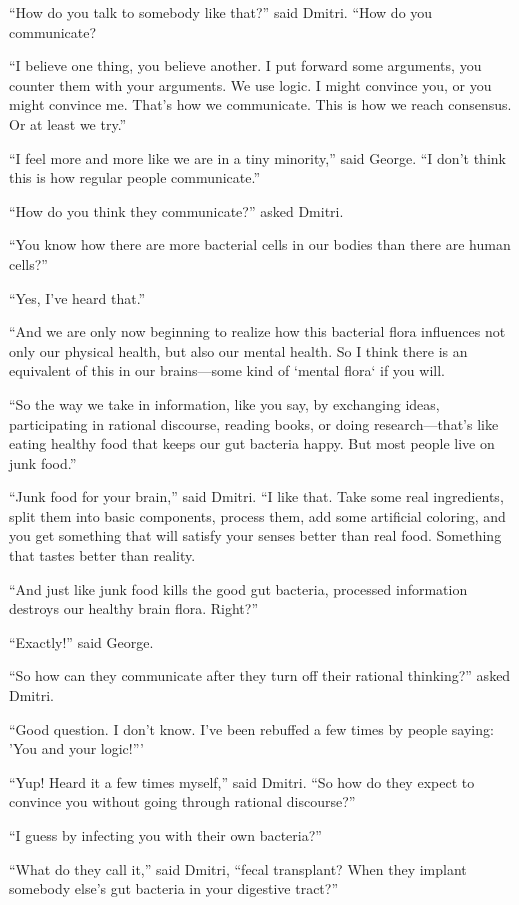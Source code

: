 \documentclass{memoir}
\begin{document}
``How do you talk to somebody like that?'' said Dmitri. ``How do you communicate? 

``I believe one thing, you believe another. I put forward some arguments, you counter them with your arguments. We use logic. I might convince you, or you might convince me. That's how we communicate. This is how we reach consensus. Or at least we try.''

``I feel more and more like we are in a tiny minority,'' said George. ``I don't think this is how regular people communicate.''

``How do you think they communicate?'' asked Dmitri.

``You know how there are more bacterial cells in our bodies than there are human cells?''

``Yes, I've heard that.''

``And we are only now beginning to realize how this bacterial flora influences not only our physical health, but also our mental health. So I think there is an equivalent of this in our brains---some kind of `mental flora` if you will. 

``So the way we take in information, like you say, by exchanging ideas, participating in rational discourse, reading books, or doing research---that's like eating healthy food that keeps our gut bacteria happy. But most people live on junk food.''

``Junk food for your brain,'' said Dmitri. ``I like that. Take some real ingredients, split them into basic components, process them, add some artificial coloring, and you get something that will satisfy your senses better than real food. Something that tastes better than reality.

``And just like junk food kills the good gut bacteria, processed information destroys our healthy brain flora. Right?''

``Exactly!'' said George.

``So how can they communicate after they turn off their rational thinking?'' asked Dmitri.

``Good question. I don't know. I've been rebuffed a few times by people saying: 'You and your logic!'''

``Yup! Heard it a few times myself,'' said Dmitri. ``So how do they expect to convince you without going through rational discourse?''

``I guess by infecting you with their own bacteria?''

``What do they call it,'' said Dmitri, ``fecal transplant? When they implant somebody else's gut bacteria in your digestive tract?''
\end{document}
